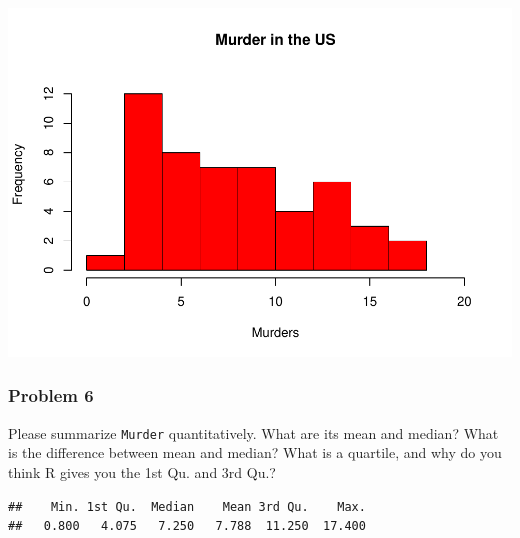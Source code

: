 \documentclass[
]{article}
\newenvironment{Shaded}{\begin{snugshade}}{\end{snugshade}}
\newcommand{\FunctionTok}[1]{\textcolor[rgb]{0.00,0.00,0.00}{#1}}
\newcommand{\NormalTok}[1]{#1}
\newcommand{\SpecialCharTok}[1]{\textcolor[rgb]{0.00,0.00,0.00}{#1}}
\begin{document}
\includegraphics{Assignments_files/figure-latex/unnamed-chunk-5-1.pdf}

\hypertarget{problem-6}{%
\subsubsection{Problem 6}\label{problem-6}}

Please summarize \texttt{Murder} quantitatively. What are its mean and
median? What is the difference between mean and median? What is a
quartile, and why do you think R gives you the 1st Qu. and 3rd Qu.?

\begin{Shaded}
\end{Shaded}

\begin{verbatim}
##    Min. 1st Qu.  Median    Mean 3rd Qu.    Max. 
##   0.800   4.075   7.250   7.788  11.250  17.400
\end{verbatim}
\end{document}
